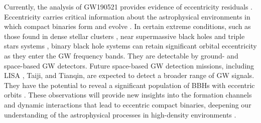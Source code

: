 \documentclass[
reprint,
superscriptaddress,
amsmath,amssymb,
aps,
prd,
floatfix,
]{revtex4-2}
\begin{document}
Currently, the analysis of GW190521 provides evidence of eccentricity residuals \cite{abbottGW190521BinaryBlack2020, romero-shawGW190521OrbitalEccentricity2020, gayathriEccentricityEstimateBlack2022, iglesiasEccentricityEstimationFive2024}.
Eccentricity carries critical information about the astrophysical environments in which compact binaries form and evolve \cite{zevinEccentricBlackHole2019, cardosoEccentricityEvolutionCompact2021,zevinImplicationsEccentricObservations2021, kneeRosettaStoneEccentric2022, divyajyotiBlindSpotsBiases2024}. 
In certain extreme conditions, such as those found in dense stellar clusters \cite{zevinEccentricBlackHole2019}, near supermassive black holes \cite{tagawaEccentricBlackHole2021} and triple stars systems \cite{antoniniBinaryBlackHole2017}, binary black hole systems can retain significant orbital eccentricity as they enter the GW frequency bands. 
They are detectable by ground- and space-based GW detectors. 
Future space-based GW detection missions, including LISA \cite{amaro-seoaneLaserInterferometerSpace2017}, Taiji\cite{huTaijiProgramSpace2017}, and Tianqin\cite{Luo2016}, are expected to detect a broader range of GW signals. 
They have the potential to reveal a significant population of BBHs with eccentric orbits \cite{breivikDISTINGUISHINGFORMATIONCHANNELS2016, nishizawaConstrainingStellarBinary2017}. 
These observations will provide new insights into the formation channels and dynamic interactions that lead to eccentric compact binaries, deepening our understanding of the astrophysical processes in high-density environments \cite{zevinEccentricBlackHole2019}.
\end{document}
